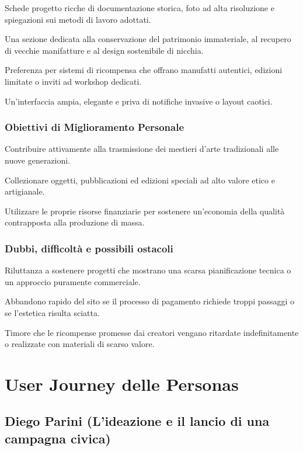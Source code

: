 \documentclass[11pt,a4paper]{article}
\begin{document}
Schede progetto ricche di documentazione storica, foto ad alta risoluzione e spiegazioni sui metodi di lavoro adottati.

Una sezione dedicata alla conservazione del patrimonio immateriale, al recupero di vecchie manifatture e al design sostenibile di nicchia.

Preferenza per sistemi di ricompensa che offrano manufatti autentici, edizioni limitate o inviti ad workshop dedicati.

Un'interfaccia ampia, elegante e priva di notifiche invasive o layout caotici.

\subsubsection{Obiettivi di Miglioramento Personale}

Contribuire attivamente alla trasmissione dei mestieri d'arte tradizionali alle nuove generazioni.

Collezionare oggetti, pubblicazioni ed edizioni speciali ad alto valore etico e artigianale.

Utilizzare le proprie risorse finanziarie per sostenere un'economia della qualità contrapposta alla produzione di massa.

\subsubsection{Dubbi, difficoltà e possibili ostacoli}

Riluttanza a sostenere progetti che mostrano una scarsa pianificazione tecnica o un approccio puramente commerciale.

Abbandono rapido del sito se il processo di pagamento richiede troppi passaggi o se l'estetica risulta sciatta.

Timore che le ricompense promesse dai creatori vengano ritardate indefinitamente o realizzate con materiali di scarso valore.
    \section{User Journey delle Personas}
    \label{sec:userjourney}

    \subsection{Diego Parini (L'ideazione e il lancio di una campagna civica)}
    \label{subsec:uj1}
\end{document}
